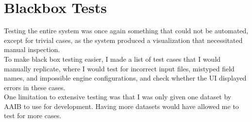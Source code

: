 \section{Blackbox Tests}

Testing the entire system was once again something that could not be automated, except for trivial cases, as the system produced a visualization that necessitated manual inspection. \\

To make black box testing easier, I made a list of test cases that I would manually replicate, where I would test for incorrect input files, mistyped field names, and impossible engine configurations, and check whether the UI displayed errors in these cases. \\

One limitation to extensive testing was that I was only given one dataset by AAIB to use for development. Having more datasets would have allowed me to test for more cases.
